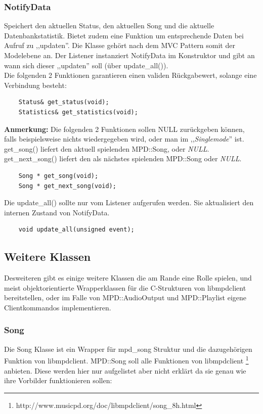 \subsubsection{NotifyData}
Speichert den aktuellen Status, den aktuellen Song und die aktuelle Datenbankstatistik.
Bietet zudem eine Funktion um entsprechende Daten bei Aufruf zu ,,updaten''.
Die Klasse gehört nach dem MVC Pattern somit der Modelebene an.
Der Listener instanziert NotifyData im Konstruktor und gibt an wann sich dieser ,,updaten'' soll (über update\_all()).
\\        

Die folgenden 2 Funktionen garantieren einen validen Rückgabewert, solange eine Verbindung besteht:
\begin{verbatim}
    Status& get_status(void);
    Statistics& get_statistics(void);
\end{verbatim}

\textbf{Anmerkung:} Die folgenden 2 Funktionen sollen NULL zurückgeben können, falls beispielsweise
nichts wiedergegeben wird, oder man im ,,\textit{Singlemode}'' ist.
get\_song() liefert den aktuell spielenden MPD::Song, oder \emph{NULL}.
get\_next\_song() liefert den als nächstes spielenden MPD::Song oder \emph{NULL}.
\begin{verbatim} 
    Song * get_song(void);
    Song * get_next_song(void);
\end{verbatim}

Die update\_all() sollte nur vom Listener aufgerufen werden. Sie aktualisiert den internen Zustand
von NotifyData.
\begin{verbatim}
    void update_all(unsigned event);
\end{verbatim}


\subsection{Weitere Klassen}
Desweiteren gibt es einige weitere Klassen die am Rande eine Rolle spielen,
und meist objektorientierte Wrapperklassen für die C-Strukturen von libmpdclient bereitstellen,
oder im Falle von MPD::AudioOutput und MPD::Playlist eigene Clientkommandos implementieren.

\subsubsection{Song}

Die Song Klasse ist ein Wrapper für mpd\_song Struktur und die dazugehörigen Funktion von libmpdclient. 
MPD::Song soll alle Funktionen von libmpdclient \footnote{http://www.musicpd.org/doc/libmpdclient/song\_8h.html} anbieten.
Diese werden hier nur aufgelistet aber nicht erklärt da sie genau wie ihre Vorbilder funktionieren sollen:


